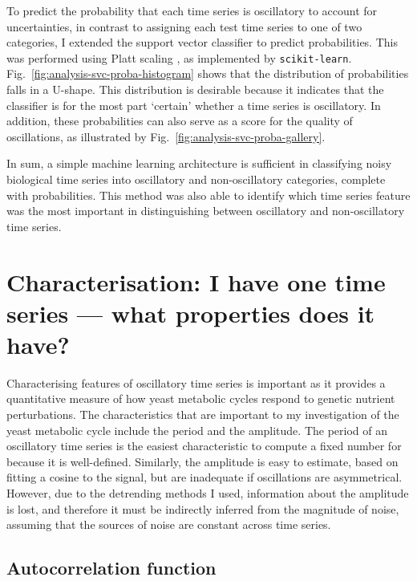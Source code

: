 To predict the probability that each time series is oscillatory to account for uncertainties, in contrast to assigning each test time series to one of two categories, I extended the support vector classifier to predict probabilities.
This was performed using Platt scaling \parencite{plattProbabilisticOutputsSupport1999}, as implemented by \texttt{scikit-learn}.
Fig.\ \ref{fig:analysis-svc-proba-histogram} shows that the distribution of probabilities falls in a U-shape.
This distribution is desirable because it indicates that the classifier is for the most part `certain' whether a time series is oscillatory.
In addition, these probabilities can also serve as a score for the quality of oscillations, as illustrated by Fig.\ \ref{fig:analysis-svc-proba-gallery}.


In sum,
a simple machine learning architecture is sufficient in classifying noisy biological time series into oscillatory and non-oscillatory categories, complete with probabilities.
This method was also able to identify which time series feature was the most important in distinguishing between oscillatory and non-oscillatory time series.


\section[Characterisation]{Characterisation: I have one time series --- what properties does it have?}
\label{sec:analysis-characterisation}

Characterising features of oscillatory time series is important as it provides a quantitative measure of how yeast metabolic cycles respond to genetic nutrient perturbations.
The characteristics that are important to my investigation of the yeast metabolic cycle include the period and the amplitude.
The period of an oscillatory time series is the easiest characteristic to compute a fixed number for because it is well-defined.
Similarly, the amplitude is easy to estimate, based on fitting a cosine to the signal, but are inadequate if oscillations are asymmetrical.
However, due to the detrending methods I used, information about the amplitude is lost, and therefore it must be indirectly inferred from the magnitude of noise, assuming that the sources of noise are constant across time series.


\subsection{Autocorrelation function}
\label{subsec:analysis-characterisation-acf}

